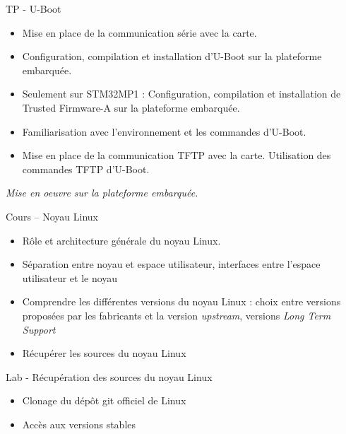 \documentclass[a4paper,12pt,obeyspaces,spaces,hyphens]{article}
\begin{document}
\feagendaonecolumn
{TP - U-Boot}
{
  \begin{itemize}
  \item Mise en place de la communication série avec la carte.
  \item Configuration, compilation et installation d'U-Boot sur la
    plateforme embarquée.
  \item Seulement sur STM32MP1 : Configuration, compilation et
    installation de Trusted Firmware-A sur la plateforme embarquée.
  \item Familiarisation avec l'environnement et les commandes
    d'U-Boot.
  \item Mise en place de la communication TFTP avec la carte.
    Utilisation des commandes TFTP d'U-Boot.
  \end{itemize}

  \vspace{0.5cm}
  {\em Mise en oeuvre sur la plateforme embarquée.}
}

\feagendatwocolumn
{Cours – Noyau Linux}
{
  \begin{itemize}
  \item Rôle et architecture générale du noyau Linux.
  \item Séparation entre noyau et espace utilisateur, interfaces entre
    l'espace utilisateur et le noyau
  \item Comprendre les différentes versions du noyau Linux : choix
    entre versions proposées par les fabricants et la version {\em
      upstream}, versions {\em Long Term Support}
  \item Récupérer les sources du noyau Linux
  \end{itemize}
}
{Lab - Récupération des sources du noyau Linux}
{
  \begin{itemize}
  \item Clonage du dépôt git officiel de Linux
  \item Accès aux versions stables
  \end{itemize}
}
\end{document}
